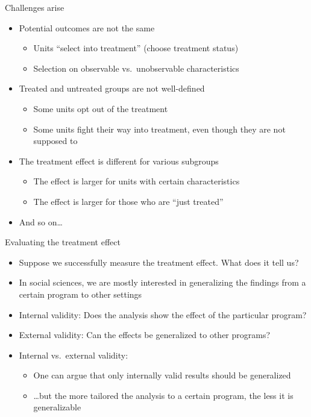 \documentclass[aspectratio=169,compress,handout,t,xcolor=table]{beamer}
\begin{document}
\begin{frame}{Challenges arise}
  \begin{itemize}
    \item Potential outcomes are not the same
    \begin{itemize}
      \item Units ``select into treatment'' (choose treatment status)
      \item Selection on observable vs.\ unobservable characteristics
    \end{itemize}
    \item Treated and untreated groups are not well-defined
    \begin{itemize}
      \item Some units opt out of the treatment
      \item Some units fight their way into treatment, even though they are not supposed to
    \end{itemize}
    \item The treatment effect is different for various subgroups
    \begin{itemize}
      \item The effect is larger for units with certain characteristics
      \item The effect is larger for those who are ``just treated''
    \end{itemize}
    \item And so on\ldots
  \end{itemize}
\end{frame}

\begin{frame}{Evaluating the treatment effect}
  \begin{itemize}
    \item Suppose we successfully measure the treatment effect. What does it tell us?
    \item In social sciences, we are mostly interested in generalizing the findings from a certain program to other settings
    \item Internal validity: Does the analysis show the effect of the particular program?
    \item External validity: Can the effects be generalized to other programs?
    \item Internal vs.\ external validity:
    \begin{itemize}
      \item One can argue that only internally valid results should be generalized
      \item \ldots but the more tailored the analysis to a certain program, the less it is generalizable
    \end{itemize}
  \end{itemize}
\end{frame}
\end{document}
